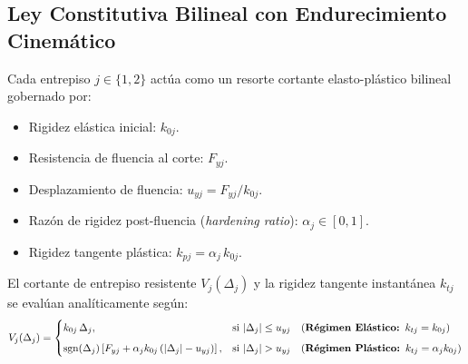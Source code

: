 \documentclass[11pt,letterpaper]{article}
\begin{document}
\subsection{Ley Constitutiva Bilineal con Endurecimiento Cinemático}

Cada entrepiso $j \in \{1, 2\}$ actúa como un resorte cortante elasto-plástico bilineal gobernado por:
\begin{itemize}
    \item Rigidez elástica inicial: $k_{0j}$.
    \item Resistencia de fluencia al corte: $F_{yj}$.
    \item Desplazamiento de fluencia: $u_{yj} = F_{yj} / k_{0j}$.
    \item Razón de rigidez post-fluencia (\textit{hardening ratio}): $\alpha_j \in [0, 1]$.
    \item Rigidez tangente plástica: $k_{pj} = \alpha_j \, k_{0j}$.
\end{itemize}

El cortante de entrepiso resistente $V_j(\Delta_j)$ y la rigidez tangente instantánea $k_{tj}$ se evalúan analíticamente según:
\begin{equation}
    \label{eq:constitutive}
    V_j(\Delta_j) = 
    \begin{cases}
        k_{0j} \, \Delta_j, & \text{si } |\Delta_j| \le u_{yj} \quad (\text{\bfseries Régimen Elástico: } k_{tj} = k_{0j}) \\[0.2cm]
        \operatorname{sgn}(\Delta_j) \left[ F_{yj} + \alpha_j k_{0j} \left(|\Delta_j| - u_{yj}\right) \right], & \text{si } |\Delta_j| > u_{yj} \quad (\text{\bfseries Régimen Plástico: } k_{tj} = \alpha_j k_{0j})
    \end{cases}
\end{equation}
\end{document}
